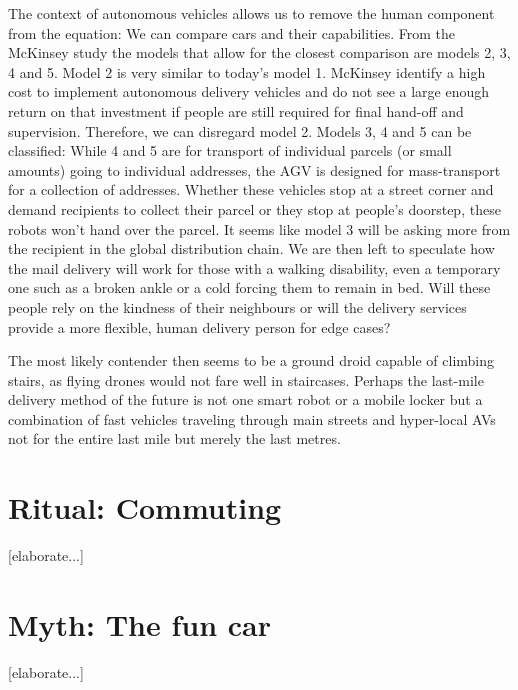 \documentclass[12pt, usenames, dvipsnames]{report}
\begin{document}
\begin{flushleft}
The context of autonomous vehicles allows us to remove the human component from the equation:
We can compare cars and their capabilities. 
From the McKinsey study \cite{mckinsey2016} the models that allow for the closest comparison are models 2, 3, 4 and 5.
Model 2 is very similar to today's model 1.
McKinsey identify a high cost to implement autonomous delivery vehicles and do not see a large enough return on that investment if people are still required for final hand-off and supervision.
Therefore, we can disregard model 2.
Models 3, 4 and 5 can be classified:
While 4 and 5 are for transport of individual parcels (or small amounts) going to individual addresses, the AGV is designed for mass-transport for a collection of addresses.
Whether these vehicles stop at a street corner and demand recipients to collect their parcel or they stop at people's doorstep, these robots won't hand over the parcel.
It seems like model 3 will be asking more from the recipient in the global distribution chain.
We are then left to speculate how the mail delivery will work for those with a walking disability, even a temporary one such as a broken ankle or a cold forcing them to remain in bed.
Will these people rely on the kindness of their neighbours or will the delivery services provide a more flexible, human delivery person for edge cases?

The most likely contender then seems to be a ground droid capable of climbing stairs, as flying drones would not fare well in staircases.
Perhaps the last-mile delivery method of the future is not one smart robot or a mobile locker but a combination of fast vehicles traveling through main streets and hyper-local AVs not for the entire last mile but merely the last metres. 


\section{Ritual: Commuting}

[elaborate...]


\section{Myth: The fun car}

[elaborate...]



\end{flushleft}
\end{document}

